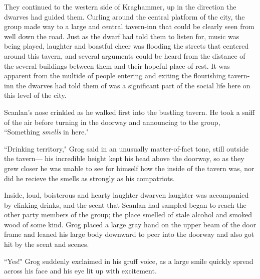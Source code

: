 They continued to the western side of Kraghammer, up in the direction the dwarves had guided them. Curling around the central platform of the city, the group made way to a large and central tavern-inn that could be clearly seen from well down the road. Just as the dwarf had told them to listen for, music was being played, laughter and boastful cheer was flooding the streets that centered around this tavern, and several arguments could be heard from the distance of the several-buildings between them and their hopeful place of rest. It was apparent from the multide of people entering and exiting the flourishing tavern-inn the dwarves had told them of was a significant part of the social life here on this level of the city.

Scanlan's nose crinkled as he walked first into the bustling tavern. He took a sniff of the air before turning in the doorway and announcing to the group, ``Something \textit{smells} in here."

``Drinking territory," Grog said in an unusually matter-of-fact tone, still outside the tavern--- his incredible height kept his head above the doorway, so as they grew closer he was unable to see for himself how the inside of the tavern was, nor did he recieve the smells as strongly as his compatriots. 

Inside, loud, boisterous and hearty laughter dwarven laughter was accompanied by clinking drinks, and the scent that Scanlan had sampled began to reach the other party members of the group; the place smelled of stale alcohol and smoked wood of some kind. Grog placed a large gray hand on the upper beam of the door frame and leaned his large body downward to peer into the doorway and also got hit by the scent and scenes. 

``Yes!" Grog suddenly exclaimed in his gruff voice, as a large smile quickly spread across his face and his eye lit up with excitement.
\newpage

